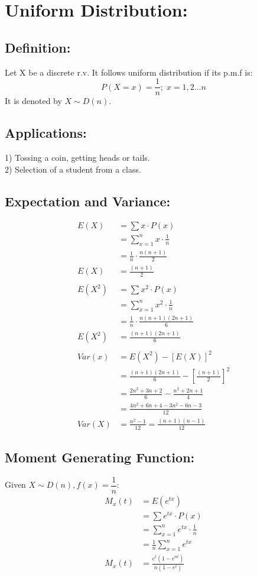 \documentclass[
10pt, %
a4paper, %
]{report}
\begin{document}
\section*{Uniform Distribution:}
\subsection*{Definition:}
Let X be a discrete r.v. It follows uniform distribution if its p.m.f is:
\[P(X=x)=\frac{1}{n};\; x=1, 2\dots n\] 
It is denoted by \(X \sim D(n).\)

\subsection*{Applications:}
1) Tossing a coin, getting heads or tails. \\
2) Selection of a student from a class.

\subsection*{Expectation and Variance:}
\begin{align*}
    E(X) &= \sum x \cdot P(x) \\
         &= \sum_{x=1}^n x\cdot\frac{1}{n} \\
         &= \frac{1}{n} \cdot \frac{n(n+1)}{2} \\
    E(X) &= \frac{(n+1)}{2} \\ \\
    E(X^2) &= \sum x^2 \cdot P(x) \\
           &= \sum_{x=1}^n x^2\cdot\frac{1}{n} \\
           &= \frac{1}{n} \cdot \frac{n(n+1)(2n+1)}{6} \\
    E(X^2) &= \frac{(n+1)(2n+1)}{6} \\ \\
    Var(x) &= E(X^2) - [E(X)]^2 \\
           &= \frac{(n+1)(2n+1)}{6} - \left[\frac{(n+1)}{2}\right]^2 \\
           &= \frac{2n^2+3n+2}{6}-\frac{n^2+2n+1}{4} \\
           &= \frac{4n^2+6n+4-3n^2-6n-3}{12} \\
    Var(X) &= \frac{n^2-1}{12} = \frac{(n+1)(n-1)}{12}
\end{align*}
\newpage

\subsection*{Moment Generating Function:}
Given \(X \sim D(n), f(x)=\dfrac{1}{n}:\)
\begin{align*}
    M_x(t) &= E(e^{tx}) \\
           &= \sum e^{tx} \cdot P(x) \\
           &= \sum_{x=1}^n e^{tx} \cdot \frac{1}{n} \\
           &= \frac{1}{n} \sum_{x=1}^n e^{tx} \\
    M_x(t) &= \frac{e^t(1-e^{nt})}{n(1-e^t)}
\end{align*}
\end{document}
